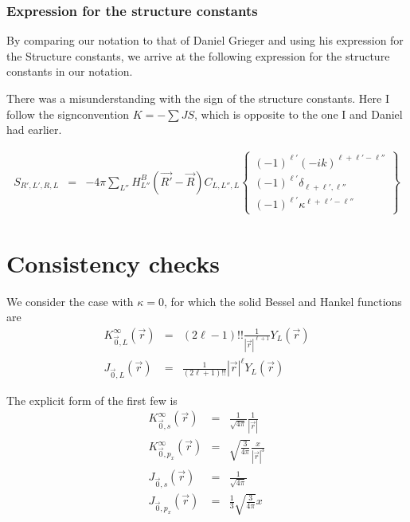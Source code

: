 \documentclass[11pt,a4paper]{report}
\begin{document}
%
\subsubsection{Expression for the structure constants}
By comparing our notation to that of Daniel Grieger and using his
expression for the Structure constants, we arrive at the following
expression for the structure constants in our notation.

There was a misunderstanding with the sign of the structure
constants. Here I follow the signconvention $K=-\sum JS$, which is
opposite to the one I and Daniel had earlier.

\begin{eqnarray}
S_{R',L',R,L}
&=&
-4\pi \sum_{L''} H^B_{L''}(\vec{R'}-\vec{R}) C_{L,L'',L} 
\left\lbrace
\begin{array}{c}
(-1)^{\ell'}
(-ik)^{\ell+\ell'-\ell''}
\\
(-1)^{\ell'}\delta_{\ell+\ell',\ell''}
\\
(-1)^{\ell'}\kappa^{\ell+\ell'-\ell''}
\end{array}\right\rbrace 
\label{eq:expressionstructureconstants}
\end{eqnarray}




\section{Consistency checks}
We consider the case with $\kappa=0$, for which the solid Bessel and Hankel functions are
\begin{eqnarray}
K_{\vec{0},L}^\infty(\vec{r})&=&(2\ell-1)!! \frac{1}{|\vec{r}|^{\ell+1}}Y_L(\vec{r})
\\
J_{\vec{0},L}(\vec{r})&=&\frac{1}{(2\ell+1)!!}|\vec{r}|^\ell Y_L(\vec{r})
\end{eqnarray}

The explicit form of the first few is
\begin{eqnarray}
K_{\vec{0},s}^\infty(\vec{r})&=&\frac{1}{\sqrt{4\pi}}\frac{1}{|\vec{r}|}
\\
K_{\vec{0},p_x}^\infty(\vec{r})&=&\sqrt{\frac{3}{4\pi}}\frac{x}{|\vec{r}|^3}
\\
J_{\vec{0},s}(\vec{r})&=&\frac{1}{\sqrt{4\pi}}
\\
J_{\vec{0},p_x}(\vec{r})&=&\frac{1}{3}\sqrt{\frac{3}{4\pi}} x
\end{eqnarray}
\end{document}
